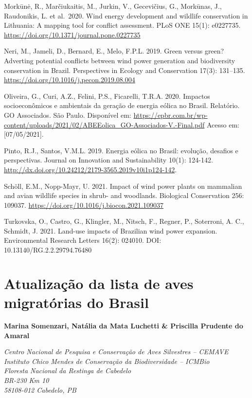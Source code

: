 \documentclass[
  oneside]{scrbook}
\begin{document}
Morkūnė, R., Marčiukaitis, M., Jurkin, V., Gecevičius, G., Morkūnas, J., Raudonikis, L. et al.~2020. Wind energy development and wildlife conservation in Lithuania: A mapping tool for conflict assessment. PLoS ONE 15(1): e0227735. \url{https://doi.org/10.1371/journal.pone.0227735}

Neri, M., Jameli, D., Bernard, E., Melo, F.P.L. 2019. Green versus green? Adverting potential conflicts between wind power generation and biodiversity conservation in Brazil. Perspectives in Ecology and Conservation 17(3): 131--135. \url{https://doi.org/10.1016/j.pecon.2019.08.004}

Oliveira, G., Curi, A.Z., Felini, P.S., Ficarelli, T.R.A. 2020. Impactos socioeconômicos e ambientais da geração de energia eólica no Brasil. Relatório. GO Associados. São Paulo. Disponível em: \url{https://epbr.com.br/wp-content/uploads/2021/02/ABEEolica_GO-Associados-V.-Final.pdf} Acesso em: {[}07/05/2021{]}.

Pinto, R.J., Santos, V.M.L. 2019. Energia eólica no Brasil: evolução, desafios e perspectivas. Journal on Innovation and Sustainability 10(1): 124-142. \url{http://dx.doi.org/10.24212/2179-3565.2019v10i1p124-142}.

Schöll, E.M., Nopp-Mayr, U. 2021. Impact of wind power plants on mammalian and avian wildlife species in shrub- and woodlands. Biological Conservation 256: 109037. \url{https://doi.org/10.1016/j.biocon.2021.109037}

Turkovska, O., Castro, G., Klingler, M., Nitsch, F., Regner, P., Soterroni, A. C., Schmidt, J. 2021. Land-use impacts of Brazilian wind power expansion. Environmental Research Letters 16(2): 024010. DOI: 10.13140/RG.2.2.29794.76480

\hypertarget{cap2}{%
\chapter{Atualização da lista de aves migratórias do Brasil}\label{cap2}}

\textbf{Marina Somenzari, Natália da Mata Luchetti \& Priscilla Prudente do Amaral}

\emph{Centro Nacional de Pesquisa e Conservação de Aves Silvestres -- CEMAVE}\\
\emph{Instituto Chico Mendes de Conservação da Biodiversidade -- ICMBio}\\
\emph{Floresta Nacional da Restinga de Cabedelo}\\
\emph{BR-230 Km 10}\\
\emph{58108-012 Cabedelo, PB}
\end{document}
